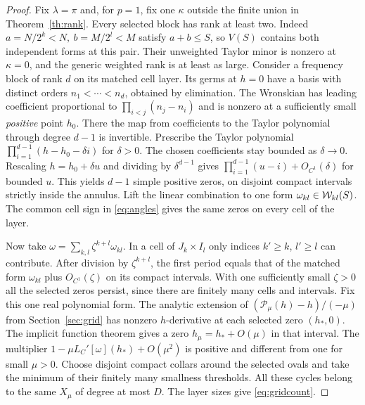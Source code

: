 \begin{proof}
Fix $\lambda=\pi$ and, for $p=1$, fix one $\kappa$ outside the finite union in Theorem~\ref{th:rank}. Every selected block has rank at least two. Indeed \(a=N/2^k<N,\ b=M/2^l<M\) satisfy \(a+b\le S\), so \(V(S)\) contains both independent forms at this pair. Their unweighted Taylor minor is nonzero at \(\kappa=0\), and the generic weighted rank is at least as large. Consider a frequency block of rank \(d\) on its matched cell layer. Its germs at $h=0$ have a basis with distinct orders $n_1<\cdots<n_d$, obtained by elimination. The Wronskian has leading coefficient proportional to $\prod_{i<j}(n_j-n_i)$ and is nonzero at a sufficiently small \emph{positive} point $h_0$. There the map from coefficients to the Taylor polynomial through degree $d-1$ is invertible. Prescribe the Taylor polynomial $\prod_{i=1}^{d-1}(h-h_0-\delta i)$ for $\delta>0$. The chosen coefficients stay bounded as $\delta\to0$. Rescaling $h=h_0+\delta u$ and dividing by $\delta^{d-1}$ gives $\prod_{i=1}^{d-1}(u-i)+O_{C^1}(\delta)$ for bounded $u$. This yields $d-1$ simple positive zeros, on disjoint compact intervals strictly inside the annulus. Lift the linear combination to one form $\omega_{kl}\in\mathcal W_{kl}(S)$. The common cell sign in \eqref{eq:angles} gives the same zeros on every cell of the layer.

Now take $\omega=\sum_{k,l}\zeta^{k+l}\omega_{kl}$. In a cell of $J_k\times I_l$ only indices $k'\ge k$, $l'\ge l$ can contribute. After division by $\zeta^{k+l}$, the first period equals that of the matched form $\omega_{kl}$ plus $O_{C^1}(\zeta)$ on its compact intervals. With one sufficiently small $\zeta>0$ all the selected zeros persist, since there are finitely many cells and intervals. Fix this one real polynomial form. The analytic extension of \((\mathcal P_\mu(h)-h)/(-\mu)\) from Section~\ref{sec:grid} has nonzero \(h\)-derivative at each selected zero \((h_*,0)\). The implicit function theorem gives a zero \(h_\mu=h_*+O(\mu)\) in that interval. The multiplier $1-\mu L_C'[\omega](h_*)+O(\mu^2)$ is positive and different from one for small $\mu>0$. Choose disjoint compact collars around the selected ovals and take the minimum of their finitely many smallness thresholds. All these cycles belong to the same $X_\mu$ of degree at most $D$. The layer sizes give \eqref{eq:gridcount}.
\end{proof}

